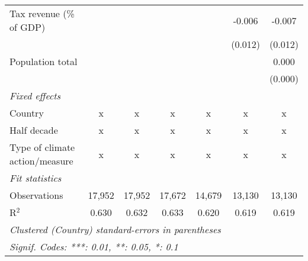 \begin{tabular}{lcccccc}
   Tax revenue (\% of GDP)              &                &                &                &               & -0.006       & -0.007\\   
                                        &                &                &                &               & (0.012)      & (0.012)\\   
   Population total                     &                &                &                &               &              & 0.000\\   
                                        &                &                &                &               &              & (0.000)\\   
   \emph{Fixed effects}\\
   Country                              & x              & x              & x              & x             & x            & x\\  
   Half decade                          & x              & x              & x              & x             & x            & x\\  
   Type of climate action/measure       & x              & x              & x              & x             & x            & x\\  
   \midrule \emph{Fit statistics}\\
   Observations                         & 17,952         & 17,952         & 17,672         & 14,679        & 13,130       & 13,130\\  
   R$^2$                                & 0.630          & 0.632          & 0.633          & 0.620         & 0.619        & 0.619\\  
   \midrule
   \multicolumn{7}{l}{\emph{Clustered (Country) standard-errors in parentheses}}\\
   \multicolumn{7}{l}{\emph{Signif. Codes: ***: 0.01, **: 0.05, *: 0.1}}\\
\end{tabular}
\par\endgroup


